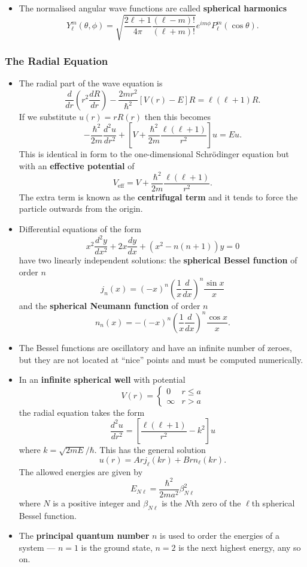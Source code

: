 \documentclass{article}
\begin{document}
\begin{itemize}
  \item The normalised angular wave functions are called \textbf{spherical harmonics} \[Y_\ell^m(\theta, \phi) = \sqrt{\frac{2 \ell + 1}{4 \pi} \frac{(\ell - m)!}{(\ell + m)!}} e^{i m \phi} P_\ell^m (\cos \theta).\]
\end{itemize}

\subsubsection{The Radial Equation}

\begin{itemize}
  \item The radial part of the wave equation is \[\frac{d}{d r} \left( r^2 \frac{d R}{d r} \right) - \frac{2 m r^2}{\hbar^2} [V(r) - E] R = \ell (\ell + 1) R.\] If we substitute $u(r) = r R(r)$ then this becomes \[-\frac{\hbar^2}{2 m} \frac{d^2 u}{d r^2} + \left[ V + \frac{\hbar^2}{2 m} \frac{\ell (\ell + 1)}{r^2} \right] u = E u.\] This is identical in form to the one-dimensional Schrödinger equation but with an \textbf{effective potential} of \[V_\text{eff} = V + \frac{\hbar^2}{2 m} \frac{\ell (\ell + 1)}{r^2}.\] The extra term is known as the \textbf{centrifugal term} and it tends to force the particle outwards from the origin.

  \item Differential equations of the form \[x^2 \frac{d^2 y}{d x^2} + 2 x \frac{d y}{d x} + (x^2 - n (n + 1)) y = 0\] have two linearly independent solutions: the \textbf{spherical Bessel function} of order $n$ \[j_n(x) = (-x)^n \left( \frac{1}{x} \frac{d}{d x} \right)^n \frac{\sin x}{x}\] and the \textbf{spherical Neumann function} of order $n$ \[n_n(x) = -(-x)^n \left( \frac{1}{x} \frac{d}{d x} \right)^n \frac{\cos x}{x}.\]
  
  \item The Bessel functions are oscillatory and have an infinite number of zeroes, but they are not located at ``nice'' points and must be computed numerically.

  \item In an \textbf{infinite spherical well} with potential \[V(r) = \begin{cases}
    0 & r \le a \\
    \infty & r > a
  \end{cases}\] the radial equation takes the form \[\frac{d^2 u}{d r^2} = \left[ \frac{\ell (\ell + 1)}{r^2} - k^2 \right] u\] where $k = \sqrt{2 m E} / \hbar$. This has the general solution \[u(r) = A r j_\ell(k r) + B r n_\ell(k r).\] The allowed energies are given by \[E_{N \ell} = \frac{\hbar^2}{2 m a^2} \beta_{N \ell}^2\] where $N$ is a positive integer and $\beta_{N \ell}$ is the $N$th zero of the $\ell$th spherical Bessel function.

  \item The \textbf{principal quantum number} $n$ is used to order the energies of a system — $n = 1$ is the ground state, $n = 2$ is the next highest energy, any so on.
\end{itemize}
\end{document}
